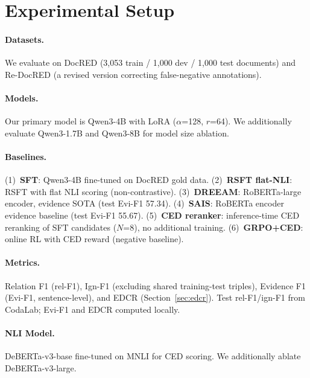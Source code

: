 \documentclass[11pt,a4paper]{article}
\begin{document}
\section{Experimental Setup}

\paragraph{Datasets.} We evaluate on DocRED (3,053 train / 1,000 dev / 1,000 test documents) and Re-DocRED (a revised version correcting false-negative annotations).

\paragraph{Models.} Our primary model is Qwen3-4B with LoRA ($\alpha$=128, $r$=64). We additionally evaluate Qwen3-1.7B and Qwen3-8B for model size ablation.

\paragraph{Baselines.}
(1)~\textbf{SFT}: Qwen3-4B fine-tuned on DocRED gold data.
(2)~\textbf{RSFT flat-NLI}: RSFT with flat NLI scoring (non-contrastive).
(3)~\textbf{DREEAM}: RoBERTa-large encoder, evidence SOTA (test Evi-F1 57.34).
(4)~\textbf{SAIS}: RoBERTa encoder evidence baseline (test Evi-F1 55.67).
(5)~\textbf{CED reranker}: inference-time CED reranking of SFT candidates ($N$=8), no additional training.
(6)~\textbf{GRPO+CED}: online RL with CED reward (negative baseline).

\paragraph{Metrics.} Relation F1 (rel-F1), Ign-F1 (excluding shared training-test triples), Evidence F1 (Evi-F1, sentence-level), and EDCR (Section~\ref{sec:edcr}). Test rel-F1/ign-F1 from CodaLab; Evi-F1 and EDCR computed locally.

\paragraph{NLI Model.} DeBERTa-v3-base fine-tuned on MNLI for CED scoring. We additionally ablate DeBERTa-v3-large.

\end{document}
